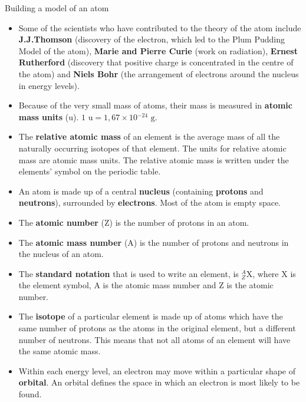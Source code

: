 \begin{groupdiscussion}{Building a model of an atom }
\end{groupdiscussion}   

    \label{m38741*cid10}
            \nopagebreak
      \label{m38741*id262657}\begin{itemize}[noitemsep]
\item Some of the scientists who have contributed to the theory of the atom include \textbf{J.J.Thomson} (discovery of the electron, which led to the Plum Pudding Model of the atom), \textbf{Marie and Pierre Curie} (work on radiation), \textbf{Ernest Rutherford} (discovery that positive charge is concentrated in the centre of the atom) and \textbf{Niels Bohr} (the arrangement of electrons around the nucleus in energy levels).
\label{m38741*uid171}\item Because of the very small mass of atoms, their mass is measured in \textbf{atomic mass units} (u). $1 \text{ u} = 1,67 \times 10{}^{-24}\text{ g}$.
\item The \textbf{relative atomic mass} of an element is the average mass of all the naturally occurring isotopes of that element. The units for relative atomic mass are atomic mass units. The relative atomic mass is written under the elements' symbol on the periodic table.
\label{m38741*uid172}\item An atom is made up of a central \textbf{nucleus} (containing \textbf{protons} and \textbf{neutrons}), surrounded by \textbf{electrons}. Most of the atom is empty space.
\label{m38741*uid173}\item The \textbf{atomic number} (Z) is the number of protons in an atom.
\label{m38741*uid174}\item The \textbf{atomic mass number} (A) is the number of protons and neutrons in the nucleus of an atom.
\label{m38741*uid175}\item The \textbf{standard notation} that is used to write an element, is $_{Z}^{A}\text{X}$, where X is the element symbol, A is the atomic mass number and Z is the atomic number.
\label{m38741*uid176}\item The \textbf{isotope} of a particular element is made up of atoms which have the same number of protons as the atoms in the original element, but a different number of neutrons. This means that not all atoms of an element will have the same atomic mass.
\label{m38741*uid179}\item Within each energy level, an electron may move within a particular shape of \textbf{orbital}. An orbital defines the space in which an electron is most likely to be found. 

\end{itemize}
